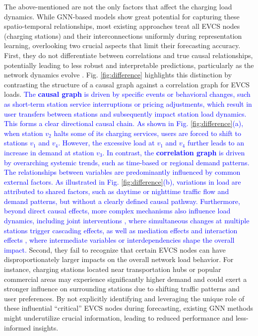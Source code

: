 \documentclass[lettersize,journal]{IEEEtran}
\newcommand{\hl}[1]{\textcolor{blue}{#1}}
\begin{document}
 The above-mentioned are not the only factors that affect the charging load dynamics. While GNN-based models show great potential for capturing these spatio-temporal relationships, most existing approaches treat all EVCS nodes (charging stations) and their interconnections uniformly during representation learning, overlooking two crucial aspects that limit their forecasting accuracy. First, they do not differentiate between correlations and true causal relationships, potentially leading to less robust and interpretable predictions, particularly as the network dynamics evolve \cite{yi2024fouriergnn}. Fig. \ref{fig:difference} highlights this distinction by contrasting the structure of a causal graph against a correlation graph for EVCS loads. 
 \hl{The \textbf{causal graph} is driven by specific events or behavioral changes, such as short-term station service interruptions or pricing adjustments, which result in user transfers between stations and subsequently impact station load dynamics. This forms a clear directional causal chain. As shown in Fig. \ref{fig:difference}(a), when station $v_2$ halts some of its charging services, users are forced to shift to stations $v_1$ and $v_4$. However, the excessive load at $v_1$ and $v_4$ further leads to an increase in demand at station $v_3$.
In contrast, the \textbf{correlation graph} is driven by overarching systemic trends, such as time-based or regional demand patterns. The relationships between variables are predominantly influenced by common external factors. As illustrated in Fig. \ref{fig:difference}(b), variations in load are attributed to shared factors, such as daytime or nighttime traffic flow and demand patterns, but without a clearly defined causal pathway. Furthermore, beyond direct causal effects, more complex mechanisms also influence load dynamics, including joint interventions \cite{mooij2020joint}, where simultaneous changes at multiple stations trigger cascading effects, as well as mediation effects \cite{10.1145/3501714.3501736} and interaction effects \cite{imai2013identification}, where intermediate variables or interdependencies shape the overall impact.}
Second, they fail to recognize that certain EVCS nodes can have disproportionately larger impacts on the overall network load behavior. For instance, charging stations located near transportation hubs or popular commercial areas may experience significantly higher demand and could exert a stronger influence on surrounding stations due to shifting traffic patterns and user preferences. By not explicitly identifying and leveraging the unique role of these influential ``critical'' EVCS nodes during forecasting, existing GNN methods might underutilize crucial information, leading to reduced performance and less-informed insights.
\end{document}
